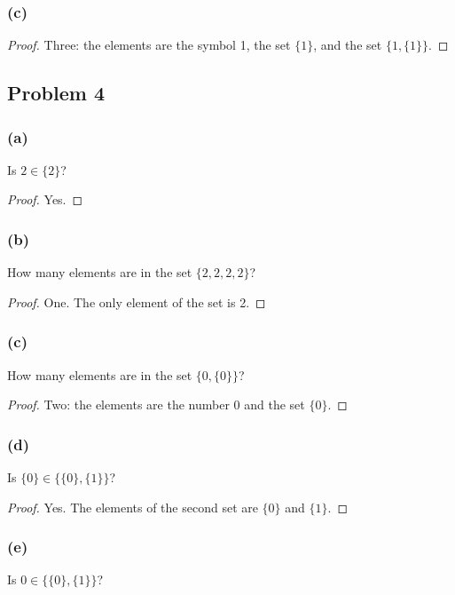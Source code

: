 \documentclass[14pt]{extarticle}
\begin{document}
\subsubsection{(c)}

\begin{proof}
Three: the elements are the symbol 1, the set $\{1\}$, and the set
$\{1, \{1\}\}$.
\end{proof}


\subsection{Problem 4}

\subsubsection{(a)}
Is $2 \in \{2\}$?

\begin{proof}
Yes.
\end{proof}

\subsubsection{(b)}
How many elements are in the set $\{2, 2, 2, 2\}$?

\begin{proof}
One. The only element of the set is 2.
\end{proof}

\subsubsection{(c)}
How many elements are in the set $\{0, \{0\}\}$?

\begin{proof}
Two: the elements are the number 0 and the set $\{0\}$.
\end{proof}

\subsubsection{(d)}
Is $\{0\} \in \{\{0\}, \{1\}\}$?

\begin{proof}
Yes. The elements of the second set are $\{0\}$ and $\{1\}$.
\end{proof}

\subsubsection{(e)}
Is $0 \in \{\{0\}, \{1\}\}$?
\end{document}
